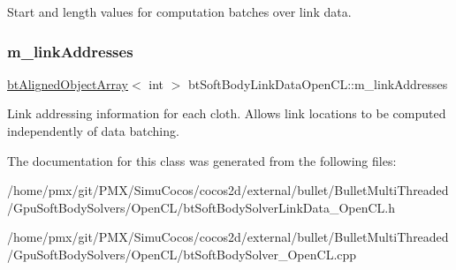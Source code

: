 Start and length values for computation batches over link data. \mbox{\label{classbtSoftBodyLinkDataOpenCL_a0e7f46fa09dc03865495188be20fe1d4}} 
\subsubsection{\texorpdfstring{m\+\_\+link\+Addresses}{m\_linkAddresses}}
{\footnotesize\ttfamily \hyperlink{classbtAlignedObjectArray}{bt\+Aligned\+Object\+Array}$<$ int $>$ bt\+Soft\+Body\+Link\+Data\+Open\+C\+L\+::m\+\_\+link\+Addresses}

Link addressing information for each cloth. Allows link locations to be computed independently of data batching. 

The documentation for this class was generated from the following files\+:\begin{DoxyCompactItemize}
\item 
/home/pmx/git/\+P\+M\+X/\+Simu\+Cocos/cocos2d/external/bullet/\+Bullet\+Multi\+Threaded/\+Gpu\+Soft\+Body\+Solvers/\+Open\+C\+L/bt\+Soft\+Body\+Solver\+Link\+Data\+\_\+\+Open\+C\+L.\+h\item 
/home/pmx/git/\+P\+M\+X/\+Simu\+Cocos/cocos2d/external/bullet/\+Bullet\+Multi\+Threaded/\+Gpu\+Soft\+Body\+Solvers/\+Open\+C\+L/bt\+Soft\+Body\+Solver\+\_\+\+Open\+C\+L.\+cpp\end{DoxyCompactItemize}
